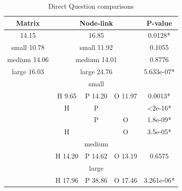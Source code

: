 \documentclass{l4proj}
\begin{document}
\begin{table}[H]
\centering
\caption{Direct Question comparisons}
\label{directResults}
\begin{tabular}{|c|c|c|c|c|c|c|}
\hline
\multicolumn{3}{|c|}{\textbf{Matrix}}     & \multicolumn{3}{c|}{\textbf{Node-link}} & \textbf{P-value}              \\ \hline
\multicolumn{3}{|c|}{14.15}               & \multicolumn{3}{c|}{16.85}              & 0.0128*                       \\ \hline
\multicolumn{3}{|c|}{small 10.78}         & \multicolumn{3}{c|}{small 11.92}        & 0.1055                        \\ \hline
\multicolumn{3}{|c|}{medium 14.06}        & \multicolumn{3}{c|}{medium 14.01}       & 0.8776                        \\ \hline
\multicolumn{3}{|c|}{large 16.03}         & \multicolumn{3}{c|}{large 24.76}        & 5.633e-07*                    \\ \hline
\multicolumn{3}{|c|}{\multirow{12}{*}{\cellcolor{gray}}}  & \multicolumn{3}{c|}{small}                                            &\cellcolor{gray} \\ \cline{4-7} 
\multicolumn{3}{|c|}{\cellcolor{gray}}                    & H 9.65      & P 14.20     & O 11.97     & 0.0013*                       \\ \cline{4-7} 
\multicolumn{3}{|c|}{\cellcolor{gray}}                    & H           & P		      &\cellcolor{gray}	& \textless2e-16*               \\ \cline{4-7} 
\multicolumn{3}{|c|}{\cellcolor{gray}}                    & \cellcolor{gray}		& P    		  & O           & 1.8e-09*                      \\ \cline{4-7} 
\multicolumn{3}{|c|}{\cellcolor{gray}}                    & H    	&\cellcolor{gray} & O           & 3.5e-05*                      \\ \cline{4-7} 
\multicolumn{3}{|c|}{\cellcolor{gray}}                    & \multicolumn{3}{c|}{medium}                                            &\cellcolor{gray} \\ \cline{4-7} 
\multicolumn{3}{|c|}{\cellcolor{gray}}                    & H 14.20     & P 14.62     & O 13.19     & 0.6575                        \\ \cline{4-7} 
\multicolumn{3}{|c|}{\cellcolor{gray}}                    & \multicolumn{3}{c|}{large}                                             &\cellcolor{gray} \\ \cline{4-7} 
\multicolumn{3}{|c|}{\cellcolor{gray}}                    & H 17.96     & P 38.86     & O 17.46     & 3.261e-06*                    \\ \cline{4-7} 

\end{tabular}
\end{table}
\end{document}
